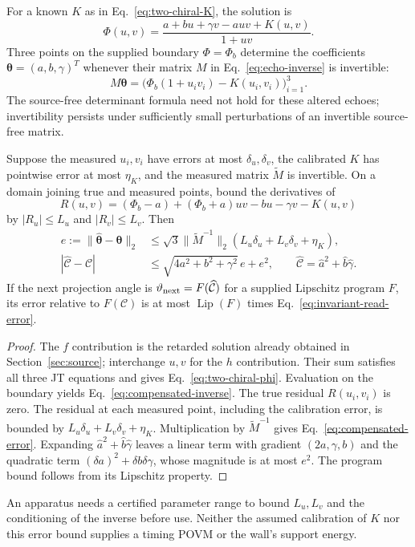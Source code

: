 \begin{proposition}\label{prop:compensated-echo}
For a known $K$ as in Eq.~\eqref{eq:two-chiral-K}, the solution is
\begin{equation}\label{eq:two-chiral-phi}
 \Phi(u,v)=\frac{a+bu+\gamma v-auv+K(u,v)}{1+uv}.
\end{equation}
Three points on the supplied boundary $\Phi=\Phi_b$ determine the coefficients
$\boldsymbol\theta=(a,b,\gamma)^T$ whenever their matrix $M$ in
Eq.~\eqref{eq:echo-inverse} is invertible:
\begin{equation}\label{eq:compensated-inverse}
 M\boldsymbol\theta=
 \bigl(\Phi_b(1+u_iv_i)-K(u_i,v_i)\bigr)_{i=1}^3.
\end{equation}
The source-free determinant formula need not hold for these altered echoes;
invertibility persists under sufficiently small perturbations of an invertible
source-free matrix.

Suppose the measured $u_i,v_i$ have errors at most $\delta_u,\delta_v$,
the calibrated $K$ has pointwise error at most $\eta_K$, and the measured
matrix $\widetilde M$ is invertible. On a domain joining true and measured points,
bound the derivatives of
\[
 R(u,v)=(\Phi_b-a)+(\Phi_b+a)uv-bu-\gamma v-K(u,v)
\]
by $|R_u|\le L_u$ and $|R_v|\le L_v$. Then
\begin{align}
 e:=\|\widehat{\boldsymbol\theta}-\boldsymbol\theta\|_2
 &\le\sqrt3\|\widetilde M^{-1}\|_2
       (L_u\delta_u+L_v\delta_v+\eta_K),\label{eq:compensated-error}\\
 |\widehat{\mathcal C}-\mathcal C|
 &\le\sqrt{4a^2+b^2+\gamma^2}\,e+e^2,
 \qquad \widehat{\mathcal C}=\widehat a^2+\widehat b\widehat\gamma.
 \label{eq:invariant-read-error}
\end{align}
If the next projection angle is $\vartheta_{\rm next}=F(\widehat{\mathcal C})$
for a supplied Lipschitz program $F$, its error relative to $F(\mathcal C)$ is
at most $\operatorname{Lip}(F)$ times Eq.~\eqref{eq:invariant-read-error}.
\end{proposition}
\begin{proof}
The $f$ contribution is the retarded solution already obtained in
Section~\ref{sec:source}; interchange $u,v$ for the $h$ contribution. Their
sum satisfies all three JT equations and gives Eq.~\eqref{eq:two-chiral-phi}.
Evaluation on the boundary yields Eq.~\eqref{eq:compensated-inverse}.
The true residual $R(u_i,v_i)$ is zero. The residual at each measured point,
including the calibration error, is bounded by
$L_u\delta_u+L_v\delta_v+\eta_K$. Multiplication by
$\widetilde M^{-1}$ gives Eq.~\eqref{eq:compensated-error}. Expanding
$\widehat a^2+\widehat b\widehat\gamma$ leaves a linear term with gradient
$(2a,\gamma,b)$ and the quadratic term
$(\delta a)^2+\delta b\delta\gamma$, whose magnitude is at most $e^2$.
The program bound follows from its Lipschitz property.
\end{proof}
An apparatus needs a certified parameter range to bound $L_u,L_v$ and the
conditioning of the inverse before use. Neither the assumed calibration of $K$
nor this error bound supplies a timing POVM or the wall's support energy.

